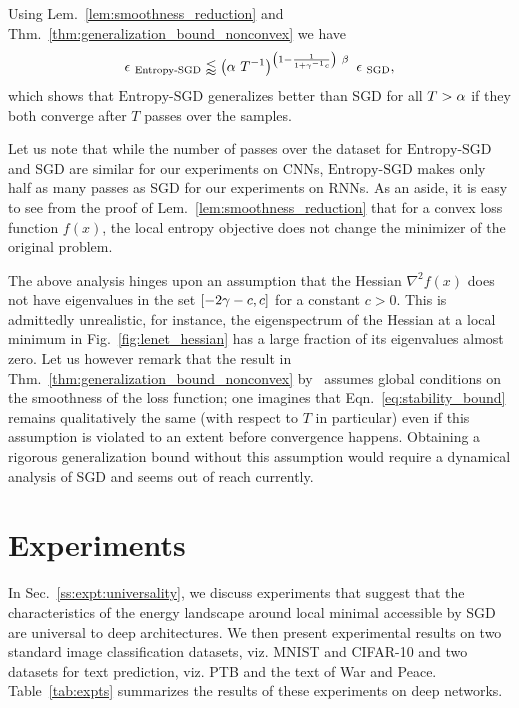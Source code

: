 \documentclass[10pt]{article}
\newcommand{\entropysgd}{\mathrm{Entropy}\textrm{-}\mathrm{SGD}}
\begin{document}
%
Using Lem.~\ref{lem:smoothness_reduction} and Thm.~\ref{thm:generalization_bound_nonconvex} we have
\begin{equation}
    \e_{\ \entropysgd} \lessapprox \rbrac{\a\ T^{-1}}^{\rbrac{1 - \f{1}{1 + \g^{-1}c}}\ \b}\ \e_{\ \textrm{SGD}},
    \label{eq:stability_bound}
\end{equation}
which shows that $\entropysgd$ generalizes better than SGD for all $T > \alpha$ if they both converge after $T$ passes over the samples.

Let us note that while the number of passes over the dataset for $\entropysgd$ and SGD are similar for our experiments on CNNs, $\entropysgd$ makes only half as many passes as SGD for our experiments on RNNs. As an aside, it is easy to see from the proof of Lem.~\ref{lem:smoothness_reduction} that for a convex loss function $f(x)$, the local entropy objective does not change the minimizer of the original problem.

\begin{remark}
The above analysis hinges upon an assumption that the Hessian $\nabla^2 f(x)$ does not have eigenvalues in the set $[-2\gamma-c, c]$ for a constant $c > 0$. This is admittedly unrealistic, for instance, the eigenspectrum of the Hessian at a local minimum in Fig.~\ref{fig:lenet_hessian} has a large fraction of its eigenvalues almost zero. Let us however remark that the result in Thm.~\ref{thm:generalization_bound_nonconvex} by~\citet{hardt2015train} assumes global conditions on the smoothness of the loss function; one imagines that Eqn.~\ref{eq:stability_bound} remains qualitatively the same (with respect to $T$ in particular) even if this assumption is violated to an extent before convergence happens. Obtaining a rigorous generalization bound without this assumption would require a dynamical analysis of SGD and seems out of reach currently.
\end{remark}

\section{Experiments}
\label{s:expt}

In Sec.~\ref{ss:expt:universality}, we discuss experiments that suggest that the characteristics of the energy landscape around local minimal accessible by SGD are universal to deep architectures. We then present experimental results on two standard image classification datasets, viz. MNIST and CIFAR-10 and two datasets for text prediction, viz. PTB and the text of War and Peace. Table~\ref{tab:expts} summarizes the results of these experiments on deep networks.
\end{document}
